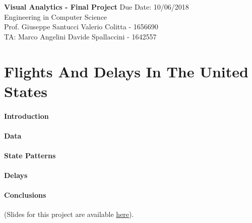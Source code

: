 \documentclass[a4paper, 12pt]{article}
\begin{document}
\noindent
\large\textbf{Visual Analytics - Final Project} \normalsize \hfill Due Date: 10/06/2018 \\
\normalsize Engineering in Computer Science   \\
Prof. Giuseppe Santucci \hfill Valerio Colitta - 1656690 \\
TA: Marco Angelini \hfill Davide Spallaccini - 1642557

\section*{Flights And Delays In The United States}

\paragraph{Introduction}


\paragraph*{Data}


\paragraph*{State Patterns}


\paragraph*{Delays}

\paragraph*{Conclusions}
(Slides for this project are available \href{https://docs.google.com/presentation/d/1T_p1oarqUuNt5APTaf7IwTJEzUDJC0CoNfJKHdak0so/edit?usp=sharing}{here}).
\end{document}
